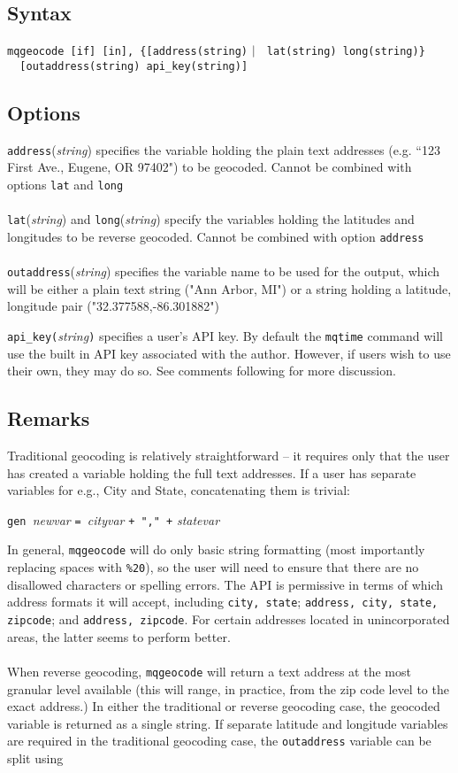 \documentclass[11pt]{article}
\begin{document}
\subsection{Syntax}
\verb|mqgeocode [if] [in], {[address(string)| $\arrowvert$ \verb| lat(string) long(string)}|\\ \verb|  [outaddress(string) api_key(string)]|


\subsection{Options}
\verb|address|(\textit{string}) specifies the variable holding the plain text addresses (e.g. ``123 First Ave., Eugene, OR 97402") to be geocoded. Cannot be combined with options \verb|lat| and \verb|long|
\\ \\
\verb|lat|(\textit{string}) and \verb|long|(\textit{string}) specify the variables holding the latitudes and longitudes to be reverse geocoded. Cannot be combined with option \verb|address|
\\ \\
\verb|outaddress|(\textit{string}) specifies the variable name to be used for the output, which will be either a plain text string ("Ann Arbor, MI") or a string holding a latitude, longitude pair ("32.377588,-86.301882")

\verb|api_key(|\textit{string}\verb|)| specifies a user's API key. By default the \verb|mqtime| command will use the built in API key associated with the author. However, if users wish to use their own, they may do so. See comments following for more discussion.

\subsection{Remarks}
Traditional geocoding is relatively straightforward -- it requires only that the user has created a variable holding the full text addresses. If a user has separate variables for e.g., City and State, concatenating them is trivial:

 \begin{center}\verb|gen |\textit{newvar} \verb|= |\textit{cityvar} \verb|+ "," +| \textit{statevar} \end{center} 
In general, \verb|mqgeocode| will do only basic string formatting (most importantly replacing spaces with \verb|%20|), so the user will need to ensure that there are no disallowed characters or spelling errors. The API is permissive in terms of which address formats it will accept, including \verb|city, state|; \verb|address, city, state, zipcode|; and \verb|address, zipcode|. For certain addresses located in unincorporated areas, the latter seems to perform better. 
\\ \\
When reverse geocoding, \verb|mqgeocode| will return a text address at the most granular level available (this will range, in practice, from the zip code level to the exact address.) In either the traditional or reverse geocoding case, the geocoded variable is returned as a single string. If separate latitude and longitude variables are required in the traditional geocoding case, the \verb|outaddress| variable can be split using
\end{document}
